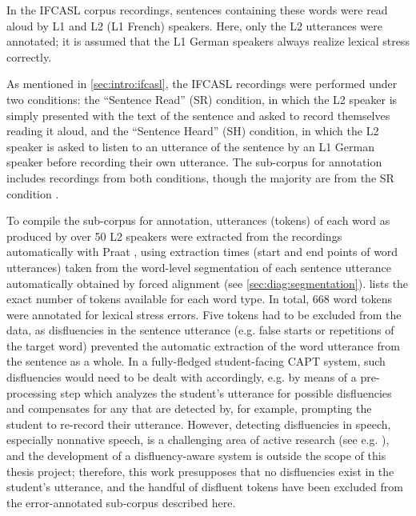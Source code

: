 	In the IFCASL corpus recordings, sentences containing these words were read aloud by L1 and L2 (L1 French) speakers. Here, only the L2 utterances were annotated; it is assumed that the L1 German speakers always realize lexical stress correctly. 
	
	As mentioned in \cref{sec:intro:ifcasl}, the IFCASL recordings were performed under two conditions: the ``Sentence Read'' (SR) condition, in which the L2 speaker is simply  presented with the text of the sentence and asked to record themselves reading it aloud, and the ``Sentence Heard'' (SH) condition, in which the L2 speaker is asked to listen to an utterance of the sentence by an L1 German speaker before recording their own utterance. The sub-corpus for annotation includes recordings from both conditions, though the majority are from the SR condition .
	
	To compile the sub-corpus for annotation, utterances (tokens) of each word as produced by over 50 L2 speakers were extracted from the recordings automatically with Praat \parencite{Boersma2014}, using extraction times (start and end points of word utterances) taken from the word-level segmentation of each sentence utterance automatically obtained by forced alignment (see \cref{sec:diag:segmentation}).
	 lists the exact number of tokens available for each word type. In total, 
	668 word tokens were annotated for lexical stress errors. 
	Five tokens had to be excluded from the data, as disfluencies in the sentence utterance (e.g. false starts or repetitions of the target word) prevented the automatic extraction of the word utterance from the sentence as a whole. In a fully-fledged student-facing CAPT system, such disfluencies would need to be dealt with accordingly, e.g. by means of a pre-processing step which analyzes the student's utterance for possible disfluencies and compensates for any that are detected by, for example, prompting the student to re-record their utterance. However, detecting disfluencies in speech, especially nonnative speech, is a challenging area of active research (see e.g. \cite{Bonneau2012,Orosanu2012}), and the development of a  disfluency-aware system is outside the scope of this thesis project; therefore, this work presupposes that no disfluencies exist in the student's utterance, and the handful of disfluent tokens have been excluded from the error-annotated sub-corpus described here.
	
